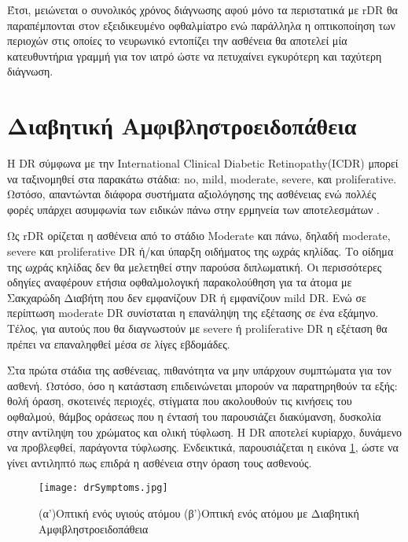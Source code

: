 Έτσι, μειώνεται ο συνολικός χρόνος διάγνωσης αφού μόνο τα περιστατικά με rDR θα παραπέμπονται στον εξειδικευμένο οφθαλμίατρο ενώ παράλληλα η οπτικοποίηση των περιοχών στις οποίες το νευρωνικό εντοπίζει την ασθένεια θα αποτελεί μία κατευθυντήρια γραμμή για τον ιατρό ώστε να πετυχαίνει εγκυρότερη και ταχύτερη διάγνωση.





\section{Διαβητική Αμφιβληστροειδοπάθεια }
\label{sec:1.3}
Η DR σύμφωνα με την International Clinical Diabetic Retinopathy(ICDR) μπορεί να ταξινομηθεί στα παρακάτω στάδια: no, mild, moderate, severe, και proliferative. Ωστόσο, απαντώνται διάφορα συστήματα αξιολόγησης της ασθένειας ενώ πολλές φορές υπάρχει ασυμφωνία των ειδικών πάνω στην ερμηνεία των αποτελεσμάτων \cite{Lin}.

Ως rDR ορίζεται η ασθένεια από το στάδιο Moderate και πάνω, δηλαδή moderate, severe και proliferative DR ή/και ύπαρξη οιδήματος της ωχράς κηλίδας. Το οίδημα της ωχράς κηλίδας δεν θα μελετηθεί στην παρούσα διπλωματική. Οι περισσότερες οδηγίες αναφέρουν ετήσια οφθαλμολογική παρακολούθηση για τα άτομα με Σακχαρώδη Διαβήτη που δεν εμφανίζουν DR ή εμφανίζουν mild DR\cite{Congdon}. Ενώ σε περίπτωση moderate DR συνίσταται η επανάληψη της εξέτασης  σε ένα εξάμηνο. Τέλος, για αυτούς που θα διαγνωστούν με severe ή proliferative  DR η εξέταση θα πρέπει να επαναληφθεί μέσα σε λίγες εβδομάδες\cite{Gulshan}.

Στα πρώτα στάδια της ασθένειας, πιθανότητα να μην υπάρχουν συμπτώματα για τον ασθενή. Ωστόσο, όσο η κατάσταση επιδεινώνεται  μπορούν να παρατηρηθούν τα εξής: θολή όραση, σκοτεινές περιοχές, στίγματα που ακολουθούν τις κινήσεις του οφθαλμού, θάμβος οράσεως που η έντασή του παρουσιάζει διακύμανση, δυσκολία στην αντίληψη του χρώματος και ολική  τύφλωση\cite{Giraddi}. Η DR αποτελεί κυρίαρχο, δυνάμενο να προβλεφθεί, παράγοντα τύφλωσης\cite{Ciulla}. Ενδεικτικά, παρουσιάζεται η εικόνα \ref{figure:drSymptoms}, ώστε να γίνει αντιληπτό πως επιδρά η ασθένεια στην όραση τους ασθενούς. 

\begin{figure}[!h]
    \centering
      \texttt{[image: drSymptoms.jpg]} \caption{(α')Οπτική ενός υγιούς ατόμου (β')Οπτική ενός ατόμου με Διαβητική Αμφιβληστροειδοπάθεια}
\label{figure:drSymptoms}  
\end{figure}

